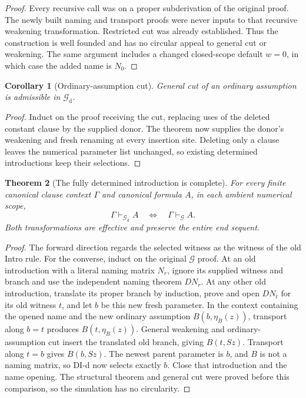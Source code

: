 \documentclass[11pt,letterpaper]{article}
\newtheorem{theorem}{Theorem}[section]
\newtheorem{corollary}[theorem]{Corollary}
\theoremstyle{definition}\newtheorem{definition}[theorem]{Definition}
\theoremstyle{remark}\newtheorem{remark}[theorem]{Remark}
\begin{document}
\begin{proof}
Every recursive call was on a proper subderivation of the original proof.
The newly built naming and transport proofs were never inputs to that
recursive weakening transformation. Restricted cut was already established.
Thus the construction is well founded and has no circular appeal to general
cut or weakening. The same argument includes a changed closed-scope default
$w=0$, in which case the added name is $N_0$.
\end{proof}

\begin{corollary}[Ordinary-assumption cut]
General cut of an ordinary assumption is admissible in
$\mathcal G_{\mathrm d}$.
\end{corollary}
\begin{proof}
Induct on the proof receiving the cut, replacing uses of the deleted constant
clause by the supplied donor. The theorem now supplies the donor's weakening
and fresh renaming at every insertion site. Deleting only a clause leaves
the numerical parameter list unchanged, so existing determined introductions
keep their selections.
\end{proof}

\begin{theorem}[The fully determined introduction is complete]
For every finite canonical clause context $\Gamma$ and canonical formula $A$,
in each ambient numerical scope,
\[
 \Gamma\vdash_{\mathcal G_{\mathrm d}}A
 \quad\Longleftrightarrow\quad
 \Gamma\vdash_{\mathcal G}A.
\]
Both transformations are effective and preserve the entire end sequent.
\end{theorem}
\begin{proof}
The forward direction regards the selected witness as the witness of the
old Intro rule. For the converse, induct on the original $\mathcal G$ proof.
At an old introduction with a literal naming matrix $N_r$, ignore its
supplied witness and branch and use the independent naming theorem $D N_r$.
At any other old introduction, translate its proper branch by induction,
prove and open $D N_t$ for its old witness $t$, and let $b$ be this new
fresh parameter. In the context containing the opened name and the new ordinary
assumption $B(b,\eta_B(z))$, transport along $b=t$ produces
$B(t,\eta_B(z))$. General weakening and ordinary-assumption cut insert the
translated old branch, giving $B(t,Sz)$. Transport along $t=b$ gives
$B(b,Sz)$. The newest parent parameter is $b$, and
$B$ is not a naming matrix, so DI-d now selects exactly $b$. Close that
introduction and the name opening. The structural theorem and general cut
were proved before this comparison, so the simulation has no circularity.
\end{proof}
\end{document}
